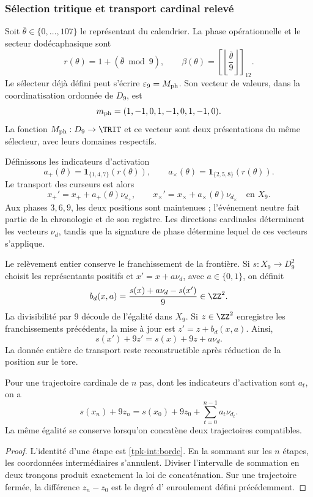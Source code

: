 \subsubsection{Sélection tritique et transport cardinal relevé}
\label{tpk-int:seleccion}

Soit \(\bar\theta\in\{0,\ldots,107\}\) le représentant du calendrier.
La phase opérationnelle et le secteur dodécaphasique sont
\begin{equation}
 r(\theta)=1+(\bar\theta\bmod9),\qquad
 \beta(\theta)=\left[\left\lfloor\frac{\bar\theta}{9}\right\rfloor\right]_{12}.
 \label{tpk-int:fase}
\end{equation}
Le sélecteur déjà défini peut s'écrire \(\varepsilon_9=M_{\rm ph}\).
Son vecteur de valeurs, dans la coordinatisation ordonnée de \(D_9\), est
\[
 m_{\rm ph}=(1,-1,0,1,-1,0,1,-1,0).
\]
La fonction \(M_{\rm ph}:D_9\to\TRIT\) et ce vecteur sont deux
présentations du même sélecteur, avec leurs domaines respectifs.

Définissons les indicateurs d'activation
\[
 a_+(\theta)=\mathbf1_{\{1,4,7\}}(r(\theta)),\qquad
 a_\times(\theta)=\mathbf1_{\{2,5,8\}}(r(\theta)).
\]
Le transport des curseurs est alors
\begin{equation}
 x_+'=x_++a_+(\theta)\nu_{d_+},\qquad
 x_\times'=x_\times+a_\times(\theta)\nu_{d_\times}
 \quad\text{en }X_9.
 \label{tpk-int:cursores}
\end{equation}
Aux phases \(3,6,9\), les deux positions sont maintenues ; l'événement neutre
fait partie de la chronologie et de son registre. Les directions cardinales
déterminent les vecteurs \(\nu_d\), tandis que la signature de phase détermine
lequel de ces vecteurs s'applique.

Le relèvement entier conserve le franchissement de la frontière. Si
\(s:X_9\to D_9^2\) choisit les représentants positifs et
\(x'=x+a\nu_d\), avec \(a\in\{0,1\}\), on définit
\begin{equation}
 b_d(x,a)=\frac{s(x)+a\nu_d-s(x')}{9}\in\ZZ^2.
 \label{tpk-int:borde}
\end{equation}
La divisibilité par \(9\) découle de l'égalité dans \(X_9\). Si \(z\in\ZZ^2\) enregistre les franchissements précédents, la mise à jour est \(z'=z+b_d(x,a)\). Ainsi,
\[
 s(x')+9z'=s(x)+9z+a\nu_d.
\]
La donnée entière de transport reste reconstructible après réduction de
la position sur le tore.

\begin{proposition}
\label{tpk-int:prop-desplazamiento}
Pour une trajectoire cardinale de \(n\) pas, dont les indicateurs d'activation sont \(a_t\), on a
\[
 s(x_n)+9z_n=s(x_0)+9z_0+
 \sum_{t=0}^{n-1}a_t\nu_{d_t}.
\]
La même égalité se conserve lorsqu'on concatène deux trajectoires compatibles.
\end{proposition}
\begin{proof}
L'identité d'une étape est \eqref{tpk-int:borde}. En la sommant sur les
\(n\) étapes, les coordonnées intermédiaires s'annulent. Diviser l'intervalle
de sommation en deux tronçons produit exactement la loi de concaténation. Sur une
trajectoire fermée, la différence \(z_n-z_0\) est le degré d'
enroulement défini précédemment.
\end{proof}

